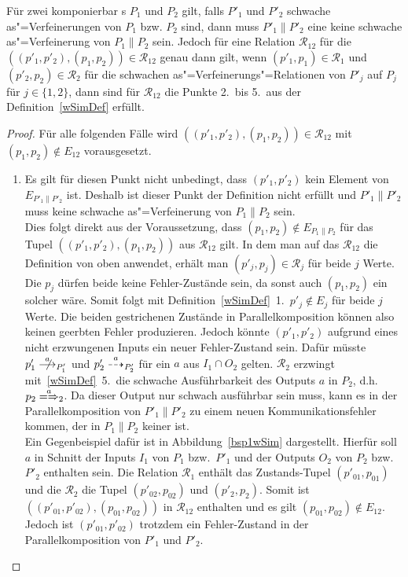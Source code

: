 \begin{Lem}
  \label{schwVerfParallelLem}
  Für zwei komponierbar \MEIO{}s $P_1$ und $P_2$ gilt, falls $P'_1$ und $P'_2$
  schwache as"=Verfeinerungen von $P_1$ bzw. $P_2$ sind, dann muss $P'_1\|P'_2$
  eine keine schwache as"=Verfeinerung von $P_1\|P_2$ sein. Jedoch für eine
  Relation $\mathcal{R}_{12}$ für die $((p'_1,p'_2),(p_1,p_2)) \in
  \mathcal{R}_{12}$ genau dann gilt, wenn $(p'_1,p_1)\in\mathcal{R}_1$ und
  $(p'_2,p_2)\in\mathcal{R}_2$ für die schwachen as"=Verfeinerungs"=Relationen
  von $P'_j$ auf $P_j$ für $j\in\{1,2\}$, dann sind für $\mathcal{R}_{12}$ die
  Punkte 2.\ bis 5.\ aus der Definition~\ref{wSimDef} erfüllt.
\end{Lem}
\begin{proof}
  Für alle folgenden Fälle wird $((p'_1,p'_2),(p_1,p_2))\in\mathcal{R}_{12}$
  mit $(p_1,p_2)\notin E_{12}$ vorausgesetzt.
  \begin{enumerate}
    \item Es gilt für diesen Punkt nicht unbedingt, dass $(p'_1,p'_2)$ kein
      Element von $E_{P'_1\|P'_2}$ ist. Deshalb ist dieser Punkt der Definition
      nicht erfüllt und $P'_1\|P'_2$ muss keine schwache as"=Verfeinerung von
      $P_1\|P_2$ sein.\\
      Dies folgt direkt aus der Voraussetzung, dass $(p_1,p_2)\notin
      E_{P_1\|P_2}$ für das Tupel $((p'_1,p'_2),(p_1,p_2))$ aus
      $\mathcal{R}_{12}$ gilt. In dem man auf das $\mathcal{R}_{12}$ die
      Definition von oben anwendet, erhält man $(p'_j,p_j)\in\mathcal{R}_j$ für
      beide $j$ Werte. Die $p_j$ dürfen beide keine Fehler-Zustände sein, da
      sonst auch $(p_1,p_2)$ ein solcher wäre. Somit folgt mit
      Definition~\ref{wSimDef}~1.\ $p'_j\notin E_j$ für beide $j$ Werte. Die
      beiden gestrichenen Zustände in Parallelkomposition können also keinen
      geerbten Fehler produzieren. Jedoch könnte $(p'_1,p'_2)$ aufgrund eines
      nicht erzwungenen Inputs ein neuer Fehler-Zustand sein. Dafür müsste
      \oBdA{} $p'_1\nmust[a]_{P'_1}$ und $p'_2\may[a]_{P'_2}$ für ein $a$ aus
      $I_1\cap O_2$ gelten. $\mathcal{R}_2$ erzwingt mit~\ref{wSimDef}~5.\ die
      schwache Ausführbarkeit des Outputs $a$ in $P_2$, d.h.\ $p_2
      \weakmay[a]_2$. Da dieser Output nur schwach ausführbar sein muss, kann
      es in der Parallelkomposition von $P'_1\|P'_2$ zu einem neuen
      Kommunikationsfehler kommen, der in $P_1\|P_2$ keiner ist.\\
      Ein Gegenbeispiel dafür ist in Abbildung~\ref{bsp1wSim} dargestellt.
      Hierfür soll $a$ in Schnitt der Inputs $I_1$ von $P_1$ bzw.\ $P'_1$ und
      der Outputs $O_2$ von $P_2$ bzw.\ $P'_2$ enthalten sein. Die Relation
      $\mathcal{R}_1$ enthält das Zustands-Tupel $(p'_{01},p_{01})$ und die
      $\mathcal{R}_2$ die Tupel $(p'_{02},p_{02})$ und $(p'_2,p_2)$. Somit ist
      $((p'_{01},p'_{02}),(p_{01},p_{02}))$ in $\mathcal{R}_{12}$ enthalten und
      es gilt $(p_{01},p_{02})\notin E_{12}$. Jedoch ist $(p'_{01},p'_{02})$
      trotzdem ein Fehler-Zustand in der Parallelkomposition von $P'_1$ und
      $P'_2$.


\end{enumerate}
\end{proof}
